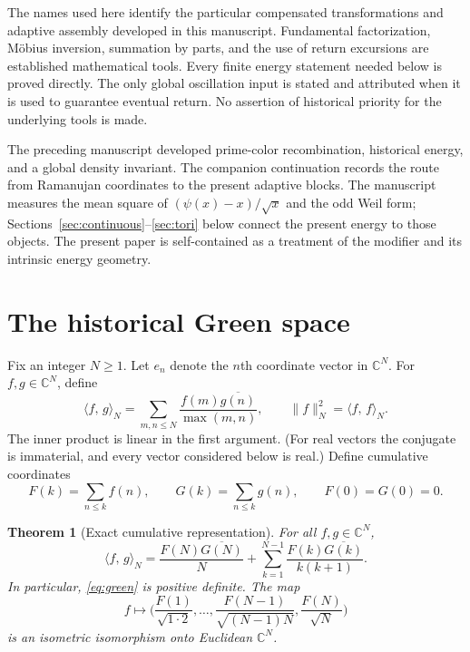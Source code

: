 \documentclass[11pt]{article}
\newtheorem{theorem}{Theorem}[section]
\theoremstyle{definition}
\theoremstyle{remark}
\newcommand{\C}{\mathbb{C}}
\newcommand{\ip}[2]{\langle #1,\, #2\rangle}
\begin{document}
The names used here identify the particular compensated transformations and adaptive assembly developed in this manuscript. Fundamental factorization, M\"obius inversion, summation by parts, and the use of return excursions are established mathematical tools. Every finite energy statement needed below is proved directly. The only global oscillation input is stated and attributed when it is used to guarantee eventual return. No assertion of historical priority for the underlying tools is made.

The preceding manuscript \cite{michaels-colors} developed prime-color recombination, historical energy, and a global density invariant. The companion continuation \cite{michaels-ramanujan} records the route from Ramanujan coordinates to the present adaptive blocks. The manuscript \cite{michaels-folds} measures the mean square of $(\psi(x)-x)/\sqrt{x}$ and the odd Weil form; Sections~\ref{sec:continuous}--\ref{sec:tori} below connect the present energy to those objects. The present paper is self-contained as a treatment of the modifier and its intrinsic energy geometry.

\section{The historical Green space}\label{sec:green}

Fix an integer $N\ge1$. Let $e_n$ denote the $n$th coordinate vector in $\C^N$. For $f,g\in\C^N$, define
\begin{equation}\label{eq:green}
\ip{f}{g}_N=\sum_{m,n\le N}\frac{f(m)\overline{g(n)}}{\max(m,n)},\qquad \|f\|_N^2=\ip{f}{f}_N.
\end{equation}
The inner product is linear in the first argument. (For real vectors the conjugate is immaterial, and every vector considered below is real.) Define cumulative coordinates
\begin{equation}
F(k)=\sum_{n\le k}f(n),\qquad G(k)=\sum_{n\le k}g(n),\qquad F(0)=G(0)=0.
\end{equation}

\begin{theorem}[Exact cumulative representation]\label{thm:cumulative}
For all $f,g\in\C^N$,
\begin{equation}\label{eq:cumrep}
\ip{f}{g}_N=\frac{F(N)\overline{G(N)}}{N}+\sum_{k=1}^{N-1}\frac{F(k)\overline{G(k)}}{k(k+1)}.
\end{equation}
In particular, \eqref{eq:green} is positive definite. The map
\begin{equation}
f\longmapsto\Big(\frac{F(1)}{\sqrt{1\cdot2}},\dots,\frac{F(N-1)}{\sqrt{(N-1)N}},\frac{F(N)}{\sqrt N}\Big)
\end{equation}
is an isometric isomorphism onto Euclidean $\C^N$.
\end{theorem}
\end{document}
